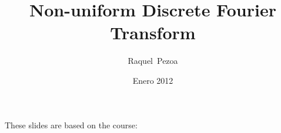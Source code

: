 \documentclass{beamer}
\title[NUDFT]{Non-uniform Discrete Fourier Transform}
\author[R. Pezoa]{%
  Raquel~Pezoa}
\institute[Universidad T\'ecnica Federico Santa Mar\'ia]{
  Departamento de Inform\'atica\\
  Universidad T\'ecnica Federico Santa Mar\'ia
}
\date[Enero 2012]{Enero 2012}
\begin{document}
  
  \frame{\titlepage}
  

\begin{frame}
\begin{center}
These slides are based on the course:


\end{center}
\end{frame}
  
\end{document}
